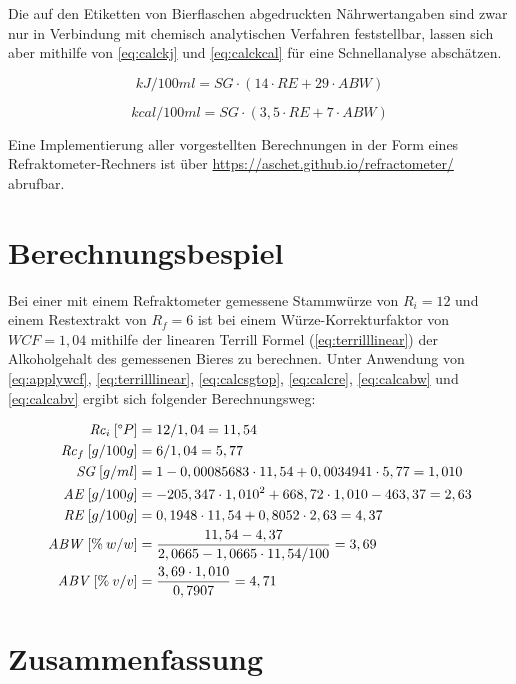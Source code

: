 \documentclass[a4paper,parskip=half]{scrartcl}
\newcommand{\bxi}{\mathit{R}_i}
\newcommand{\bxic}{\mathit{Rc}_i}
\newcommand{\bxf}{\mathit{R}_f}
\newcommand{\bxfc}{\mathit{Rc}_f}
\newcommand{\sg}{\mathit{SG}}
\newcommand{\abv}{\mathit{ABV}}
\newcommand{\abw}{\mathit{ABW}}
\newcommand{\aex}{\mathit{AE}}
\newcommand{\rex}{\mathit{RE}}
\newcommand{\wcf}{\mathit{WCF}}
\begin{document}
Die auf den Etiketten von Bierflaschen abgedruckten Nährwertangaben sind
zwar nur in Verbindung mit chemisch analytischen Verfahren feststellbar,
lassen sich aber mithilfe von \autoref{eq:calckj} und \autoref{eq:calckcal}
für eine Schnellanalyse abschätzen. \autocite{MEBAK2013} 

\begin{equation}
kJ/100ml = \sg \cdot (14 \cdot \rex + 29 \cdot \abw)
\label{eq:calckj}
\end{equation}

\begin{equation}
kcal/100ml = \sg \cdot (3,5 \cdot \rex + 7 \cdot \abw)
\label{eq:calckcal}
\end{equation}

Eine Implementierung aller vorgestellten Berechnungen in der Form eines
Refraktometer-Rechners ist über \url{https://aschet.github.io/refractometer/}
abrufbar.

\section*{Berechnungsbespiel}

Bei einer mit einem Refraktometer gemessene Stammwürze von $\bxi = 12$
und einem Restextrakt von $\bxf = 6$ ist bei einem Würze-Korrekturfaktor
von $\wcf = 1,04$ mithilfe der linearen Terrill Formel
(\autoref{eq:terrilllinear}) der Alkoholgehalt des gemessenen Bieres
zu berechnen. Unter Anwendung von \autoref{eq:applywcf},
\autoref{eq:terrilllinear}, \autoref{eq:calcsgtop},
\autoref{eq:calcre}, \autoref{eq:calcabw} und \autoref{eq:calcabv} ergibt
sich folgender Berechnungsweg:

\begin{align*}
\bxic\:[\degree P] &= 12 / 1,04 = 11,54 \\
\bxfc\:[g/100g] &= 6 / 1,04 = 5,77 \\
\sg\:[g/ml] &= 1 - 0,00085683 \cdot 11,54 + 0,0034941 \cdot 5,77 = 1,010 \\
\aex\:[g/100g] &= -205,347 \cdot 1,010^2 + 668,72 \cdot 1,010 - 463,37 = 2,63 \\
\rex\:[g/100g] &= 0,1948 \cdot 11,54 + 0,8052 \cdot 2,63 = 4,37 \\
\abw\:[\%\:w/w] &= \frac{11,54 - 4,37}{2,0665 - 1,0665 \cdot 11,54 / 100} = 3,69 \\
\abv\:[\%\:v/v] &= \frac{3,69 \cdot 1,010}{0,7907} = 4,71
\end{align*}

\section*{Zusammenfassung}
\end{document}
